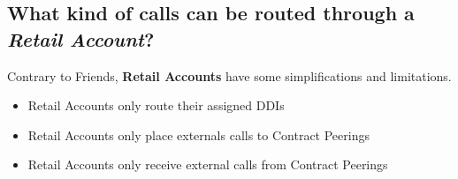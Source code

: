 \documentclass[letterpaper,10pt,english]{sphinxmanual}
\begin{document}
\subsection{What kind of calls can be routed through a \emph{Retail Account}?}
\label{retail/accounts:what-kind-of-calls-can-be-routed-through-a-retail-account}
Contrary to Friends, \textbf{Retail Accounts} have some simplifications and limitations.
\begin{itemize}
\item {} 
Retail Accounts only route their assigned DDIs

\item {} 
Retail Accounts only place externals calls to Contract Peerings

\item {} 
Retail Accounts only receive external calls from Contract Peerings

\end{itemize}
\end{document}
